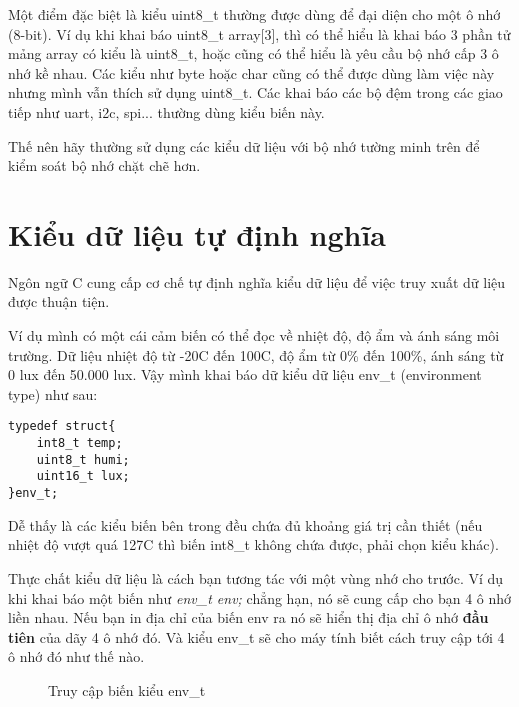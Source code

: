 Một điểm đặc biệt là kiểu uint8\_t thường được dùng để đại diện cho một ô nhớ (8-bit). Ví dụ khi khai báo uint8\_t array[3], thì có thể hiểu là khai báo 3 phần tử mảng array có kiểu là uint8\_t, hoặc cũng có thể hiểu là yêu cầu bộ nhớ cấp 3 ô nhớ kề nhau. Các kiểu như byte hoặc char cũng có thể được dùng làm việc này nhưng mình vẫn thích sử dụng uint8\_t. Các khai báo các bộ đệm trong các giao tiếp như uart, i2c, spi... thường dùng kiểu biến này.

Thế nên hãy thường sử dụng các kiểu dữ liệu với bộ nhớ tường minh trên để kiểm soát bộ nhớ chặt chẽ hơn.\\
\section{Kiểu dữ liệu tự định nghĩa}

Ngôn ngữ C cung cấp cơ chế tự định nghĩa kiểu dữ liệu để việc truy xuất dữ liệu được thuận tiện.


Ví dụ mình có một cái cảm biến có thể đọc về nhiệt độ, độ ẩm và ánh sáng môi trường. Dữ liệu nhiệt độ từ  -20\textdegree{}C đến 100\textdegree{}C, độ ẩm từ 0\% đến 100\%, ánh sáng từ 0 lux đến 50.000 lux. Vậy mình khai báo dữ kiểu dữ liệu env\_t (environment type) như sau: 
\begin{lstlisting}
typedef struct{
    int8_t temp;
    uint8_t humi;
    uint16_t lux;
}env_t;
\end{lstlisting}

Dễ thấy là các kiểu biến bên trong đều chứa đủ khoảng giá trị cần thiết (nếu nhiệt độ vượt quá 127\textdegree{}C thì biến int8\_t không chứa được, phải chọn kiểu khác).

Thực chất kiểu dữ liệu là cách bạn tương tác với một vùng nhớ cho trước. Ví dụ khi khai báo một biến như \textit{env\_t env;} chẳng hạn, nó sẽ cung cấp cho bạn 4 ô nhớ liền nhau. Nếu bạn in địa chỉ của biến env ra nó sẽ hiển thị địa chỉ ô nhớ \textbf{đầu tiên} của dãy 4 ô nhớ đó. Và kiểu env\_t sẽ cho máy tính biết cách truy cập tới 4 ô nhớ đó như thế nào.

\begin{figure}[h!]
\centering
{}
\caption{Truy cập biến kiểu env\_t} %
\end{figure}

